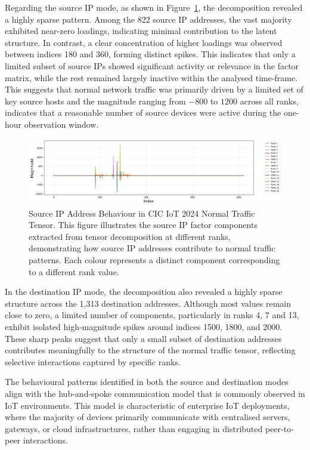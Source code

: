 \documentclass[preprint,12pt,authoryear]{elsarticle}
\begin{document}
Regarding the source IP mode, as shown in Figure~\ref{fig:source_IP}, the decomposition revealed a highly sparse pattern. Among the 822 source IP addresses, the vast majority exhibited near-zero loadings, indicating minimal contribution to the latent structure. In contrast, a clear concentration of higher loadings was observed between indices 180 and 360, forming distinct spikes. This indicates that only a limited subset of source IPs showed significant activity or relevance in the factor matrix, while the rest remained largely inactive within the analysed time-frame. This suggests that normal network traffic was primarily driven by a limited set of key source hosts and the magnitude ranging from $-800$ to $1200$ across all ranks, indicates that a reasonable number of source devices were active during the one-hour observation window.


\begin{figure}[H]
    \centering    \includegraphics[width=1.2\linewidth]{Source IP mode.png}
    \caption{Source IP Address Behaviour in CIC IoT 2024 Normal Traffic Tensor.
This figure illustrates the source IP factor components extracted from tensor decomposition at different ranks, demonstrating how source IP addresses contribute to normal traffic patterns. Each colour represents a distinct component corresponding to a different rank value.}
    \label{fig:source_IP}
\end{figure}

In the destination IP mode, the decomposition also revealed a highly sparse structure across the 1,313 destination addresses. Although most values remain close to zero, a limited number of components, particularly in ranks 4, 7 and 13, exhibit isolated high-magnitude spikes around indices 1500, 1800, and 2000. These sharp peaks suggest that only a small subset of destination addresses contributes meaningfully to the structure of the normal traffic tensor, reflecting selective interactions captured by specific ranks.

The behavioural patterns identified in both the source and destination modes align with the hub-and-spoke communication model that is commonly observed in IoT environments. This model is characteristic of enterprise IoT deployments, where the majority of devices primarily communicate with centralised servers, gateways, or cloud infrastructures, rather than engaging in distributed peer-to-peer interactions.
\end{document}
